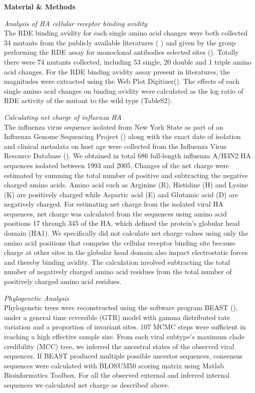 \documentclass[12pt,a4paper]{article}
\begin{document}
    

 

{\bf Material \& Methods}

\textit{Analysis of HA cellular receptor binding avidity} \\
The RDE binding avidity for each single amino acid changes were both collected 34 mutants from the publicly available literatures (\cite{Hensley2009} \cite{Das2011} \cite{Myers2013} \cite{Li}) and given by the group performing the RDE assay for monoclonal antibodies selected sites (\cite{Hensley2009}). Totally there were 74 mutants collected, including 53 single, 20 double and 1 triple amino acid changes. For the RDE binding avidity assay present in literatures, the magnitudes were extracted using the Web Plot Digitizer(\cite{Rohatgi2012}). The effects of each single amino acid changes on binding avidity were calculated as the log ratio of RDE activity of the mutant to the wild type (TableS2).

\textit{Calculating net charge of influenza HA} \\
The influenza virus sequence isolated from New York State as part of an Influenza Genome Sequencing Project (\cite{Ghedin2005}) along with the exact date of isolation and clinical metadata on host age were collected from the Influenza Virus Resource Database (\cite{Bao2008}). We obtained in total 686 full-length influenza A/H3N2 HA sequences isolated between 1993 and 2005. Changes of the net charge were estimated by summing the total number of positive and subtracting the negative  charged amino acids. Amino acid such as Arginine (R), Histidine (H) and Lysine (K) are positively charged while Aspartic acid (E) and Glutamic acid (D) are negatively charged. For estimating net charge from the isolated viral HA sequences, net charge was calculated from the sequences using amino acid positions 17 through 345 of the HA, which defined the protein’s globular head domain (HA1). We specifically did not calculate net charge values using only the amino acid positions that comprise the cellular receptor binding site because charge at other sites in the globular head domain also impact electrostatic forces and thereby binding avidity. The calculation involved subtracting the total number of negatively charged amino acid residues from the total number of positively charged amino acid residues.

\textit{Phylogenetic Analysis} \\
Phylogenetic trees were reconstructed using the software program BEAST (\cite{Drummond2012}), under a general time reversible (GTR) model with gamma distributed rate variation and a proportion of invariant sites. 107 MCMC steps were sufficient in reaching a high effective sample size. From each viral subtype’s maximum clade credibility (MCC) tree, we inferred the ancestral states of the observed viral sequences. If BEAST produced multiple possible ancestor sequences, consensus sequences were calculated with BLOSUM50 scoring matrix using Matlab Bioinformatics Toolbox. For all the observed external and inferred internal sequences we calculated net charge as described above.
\end{document}
